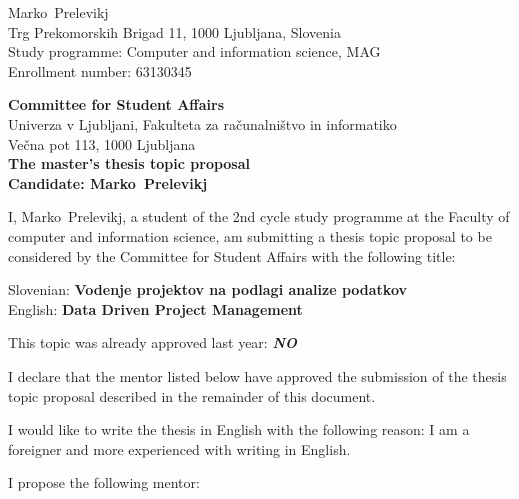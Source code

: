 \documentclass[a4paper, 12pt]{article}
\begin{document}
\newcommand{\ImeKandidata}{Marko} %
\newcommand{\PriimekKandidata}{Prelevikj} %
\newcommand{\VpisnaStevilka}{63130345} %
\newcommand{\StudyProgramme}{Computer and information science, MAG} %
\newcommand{\NaslovBivalisca}{Trg Prekomorskih Brigad 11, 1000 Ljubljana, Slovenia} %
\newcommand{\SLONaslov}{Vodenje projektov na podlagi analize podatkov} %
\newcommand{\ENGNaslov}{Data Driven Project Management} %


\newcommand{\Kandidat}{\ImeKandidata~\PriimekKandidata}
\noindent
\Kandidat\\
\NaslovBivalisca \\
Study programme: \StudyProgramme \\
Enrollment number: \VpisnaStevilka
\bigskip

{\bf Committee for Student Affairs}\\
Univerza v Ljubljani, Fakulteta za računalništvo in informatiko\\
Večna pot 113, 1000 Ljubljana\\

{\Large\bf
{\centering
    The master’s thesis topic proposal \\%
\large Candidate: \Kandidat \\[10mm]}}


I, \Kandidat, a student of the 2nd cycle study programme at the Faculty of computer and information science, am submitting a thesis topic proposal to be considered by the Committee for Student Affairs with the following title:

Slovenian: {\bf \SLONaslov}\\
English: {\bf \ENGNaslov}

This topic was already approved last year: {\bf \textit{NO}}

I declare that the mentor listed below have approved the submission of the thesis topic proposal described in the remainder of this document.

I would like to write the thesis in English with the following reason: I am a foreigner and more experienced with writing in English.

I propose the following mentor:
\end{document}
